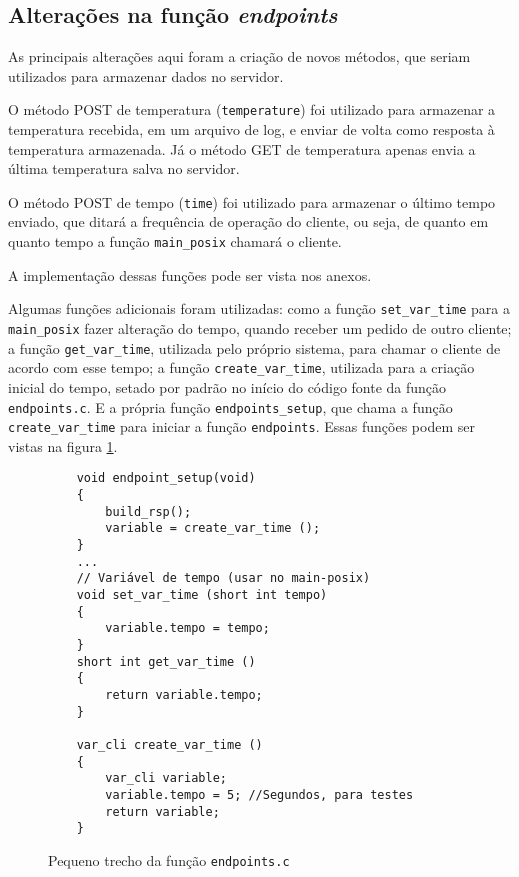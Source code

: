 \hfill \break
\hfill \break
\hfill \break
\hfill \break
\hfill \break
\hfill \break

\subsection{Alterações na função \textit{endpoints}}

As principais alterações aqui foram a criação de novos métodos, que seriam utilizados para armazenar dados no servidor.

O método POST de temperatura (\texttt{temperature}) foi utilizado para armazenar a temperatura recebida, em um arquivo de log, e enviar de volta como resposta à temperatura armazenada. Já o método GET de temperatura apenas envia a última temperatura salva no servidor.

O método POST de tempo (\texttt{time}) foi utilizado para armazenar o último tempo enviado, que ditará a frequência de operação do cliente, ou seja, de quanto em quanto tempo a função \texttt{main\_posix} chamará o cliente.

A implementação dessas funções pode ser vista nos anexos.

Algumas funções adicionais foram utilizadas: como a função \texttt{set\_var\_time} para a \texttt{main\_posix} fazer alteração do tempo, quando receber um pedido de outro cliente; a função \texttt{get\_var\_time}, utilizada pelo próprio sistema, para chamar o cliente de acordo com esse tempo; a função \texttt{create\_var\_time}, utilizada para a criação inicial do tempo, setado por padrão no início do código fonte da função \texttt{endpoints.c}. E a própria função \texttt{endpoints\_setup}, que chama a função \texttt{create\_var\_time} para iniciar a função \texttt{endpoints}. Essas funções podem ser vistas na figura \ref{code:endpoints.c}.

\begin{figure}[!htb]
	\begin{lstlisting}
	void endpoint_setup(void)
	{
		build_rsp();
		variable = create_var_time ();
	}
	...	
	// Variável de tempo (usar no main-posix)
	void set_var_time (short int tempo)
	{
		variable.tempo = tempo;
	}
	short int get_var_time ()
	{
		return variable.tempo;
	}
	
	var_cli create_var_time ()
	{
		var_cli variable;
		variable.tempo = 5; //Segundos, para testes
		return variable;
	}
	\end{lstlisting}
	\caption{Pequeno trecho da função \texttt{endpoints.c}}
	\label{code:endpoints.c}
\end{figure}
